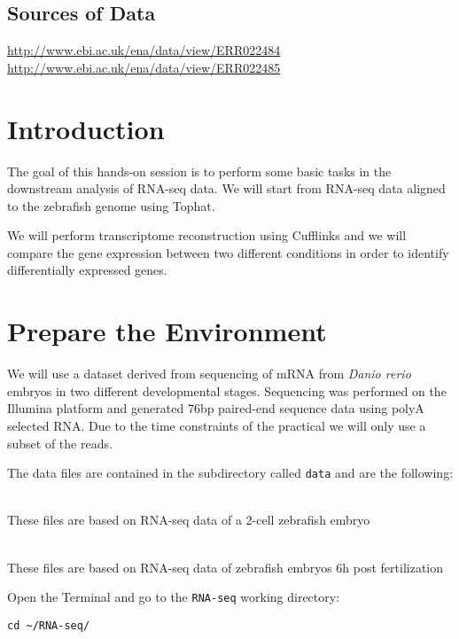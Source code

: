 \subsection{Sources of Data}
\url{http://www.ebi.ac.uk/ena/data/view/ERR022484}\\
\url{http://www.ebi.ac.uk/ena/data/view/ERR022485}

\newpage

\section{Introduction}
The goal of this hands-on session is to perform some basic tasks in the
downstream analysis of RNA-seq data. We will start from RNA-seq data aligned to
the zebrafish genome using Tophat.

We will perform transcriptome reconstruction using Cufflinks and we will compare
the gene expression between two different conditions in order to identify
differentially expressed genes.

\section{Prepare the Environment}
We will use a dataset derived from sequencing of mRNA from \textit{Danio rerio} embryos
in two different developmental stages. Sequencing was performed on the Illumina
platform and generated 76bp paired-end sequence data using polyA selected RNA.
Due to the time constraints of the practical we will only use a subset of the
reads.

The data files are contained in the subdirectory called \texttt{data} and are
the following:
\begin{description}[style=multiline,labelindent=1.5cm,align=left,leftmargin=2.5cm]
  \item[\texttt{2cells\_1.fastq} and \texttt{2cells\_2.fastq}] \hfill\\
 These files are based on RNA-seq data of a 2-cell zebrafish embryo
  \item[\texttt{6h\_1.fastq} and \texttt{6h\_2.fastq}] \hfill\\
 These files are based on RNA-seq data of zebrafish embryos 6h post
 fertilization
\end{description}

\begin{steps}
Open the Terminal and go to the \texttt{RNA-seq} working directory:
\begin{lstlisting}
cd ~/RNA-seq/
\end{lstlisting}
\end{steps}

